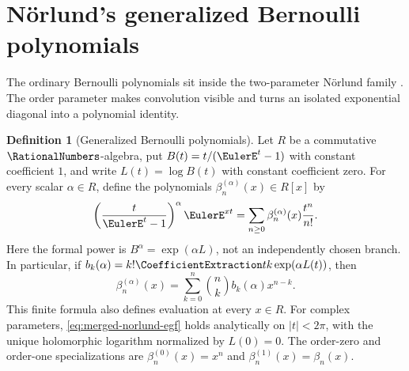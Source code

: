 \documentclass[11pt,a4paper,oneside,openany]{book}
\theoremstyle{definition}
\newtheorem{definition}[theorem]{Definition}
\theoremstyle{remark}
\begin{document}
\section{N\"orlund's generalized Bernoulli polynomials}
\label{sec:merged-norlund-polynomials}

The ordinary Bernoulli polynomials sit inside the two-parameter N\"orlund
family \cite{Norlund1924}.  The order parameter makes convolution visible and
turns an isolated exponential diagonal into a polynomial identity.

\begin{definition}[Generalized Bernoulli polynomials]
\label{def:merged-norlund-polynomials}
Let $R$ be a commutative $\RationalNumbers$-algebra, put
$B(t)=t/(\EulerE^t-1)$ with constant coefficient $1$, and write
$L(t)=\log B(t)$ with constant coefficient zero.
For every scalar $\alpha\in R$, define the polynomials
$\beta_n^{(\alpha)}(x)\in R[x]$ by
\begin{equation}
 \left(\frac{t}{\EulerE^t-1}\right)^\alpha\EulerE^{xt}
 =\sum_{n\geq0}\beta_n^{(\alpha)}(x)\frac{t^n}{n!}.                \label{eq:merged-norlund-egf}
\end{equation}
Here the formal power is $B^\alpha=\exp(\alpha L)$, not an independently
chosen branch.  In particular, if
$b_k(\alpha)=k!\CoefficientExtraction tk\exp(\alpha L(t))$, then
\[
 \beta_n^{(\alpha)}(x)
 =\sum_{k=0}^n\binom nk b_k(\alpha)x^{n-k}.
\]
This finite formula also defines evaluation at every $x\in R$.
For complex parameters, \eqref{eq:merged-norlund-egf} holds analytically
on $|t|<2\pi$, with the unique holomorphic logarithm normalized by $L(0)=0$.
The order-zero and order-one specializations are
$\beta_n^{(0)}(x)=x^n$ and $\beta_n^{(1)}(x)=\beta_n(x)$.
\end{definition}
\end{document}
